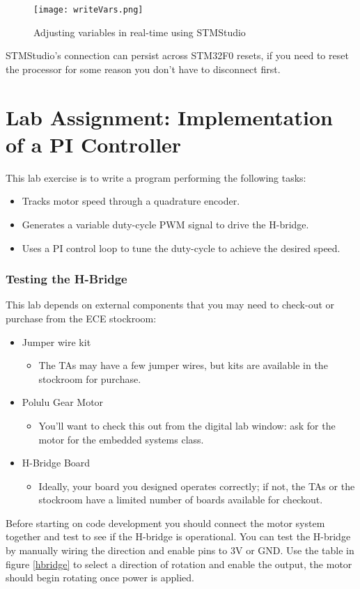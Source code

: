 \documentclass[openany,11pt,fleqn]{book} %
\begin{document}
\begin{figure}[tb]
    \centering\texttt{[image: writeVars.png]}
    \caption{Adjusting variables in real-time using STMStudio}
    \label{writeVars}
\end{figure}

STMStudio's connection can persist across STM32F0 resets, if you need to reset the processor for some reason you don't have to disconnect first.


\newpage
\section{\color{blue}Lab Assignment: Implementation of a PI Controller}
\begin{exercise}
This lab exercise is to write a program performing the following tasks:
\begin{itemize}
    \item Tracks motor speed through a quadrature encoder.
    \item Generates a variable duty-cycle PWM signal to drive the H-bridge.
    \item Uses a PI control loop to tune the duty-cycle to achieve the desired speed.
\end{itemize}

\subsubsection{Testing the H-Bridge}
This lab depends on external components that you may need to check-out or purchase from the ECE stockroom:
\begin{itemize}
    \item Jumper wire kit
    \begin{itemize}
        \item The TAs may have a few jumper wires, but kits are available in the stockroom for purchase.
    \end{itemize}
    \item Polulu Gear Motor 
    \begin{itemize}
        \item You'll want to check this out from the digital lab window: ask for the motor for the embedded systems class.
    \end{itemize}
    \item H-Bridge Board
    \begin{itemize}
        \item Ideally, your board you designed operates correctly; if not, the TAs or the stockroom have a limited number of boards available for checkout.
    \end{itemize}
\end{itemize}
Before starting on code development you should connect the motor system together and test to see if the H-bridge is operational. You can test the H-bridge by manually wiring the direction and enable pins to 3V or GND. Use the table in figure \ref{hbridge} to select a direction of rotation and enable the output, the motor should begin rotating once power is applied. 
\end{exercise}
\end{document}
